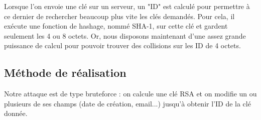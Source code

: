 \documentclass{../res/univ-projet}
\begin{document}
  Lorsque l'on envoie une clé sur un serveur, un "ID" est calculé pour permettre à ce dernier 
  de rechercher beaucoup plus vite les clés demandés. Pour cela, il exécute une fonction de hashage, nommé SHA-1,
  sur cette clé et gardent seulement les 4 ou 8 octets. Or, nous disposons maintenant d'une assez grande 
  puissance de calcul pour pouvoir trouver des collisions sur les ID de 4 octets.
  
  \subsection{Méthode de réalisation}
  
  Notre attaque est de type bruteforce : on calcule une clé RSA et on modifie un ou plusieurs de ses champs (date de création, email...)
  jusqu'à obtenir l'ID de la clé donnée.

%

\end{document}
